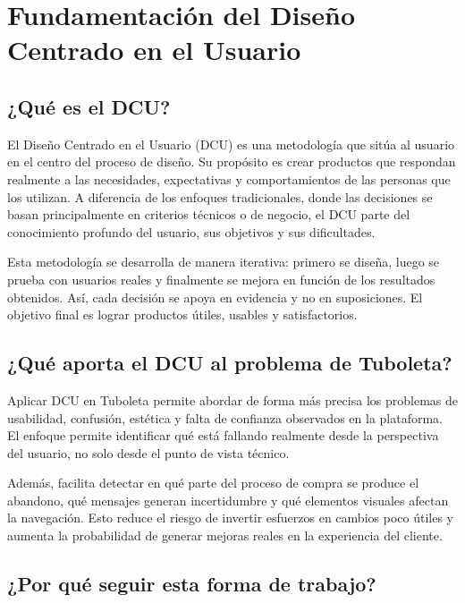 \documentclass[12pt,letterpaper]{article}
\begin{document}
\section{Fundamentación del Diseño Centrado en el Usuario}

\subsection{¿Qué es el DCU?}

El Diseño Centrado en el Usuario (DCU) es una metodología que sitúa al usuario en el centro del proceso de diseño. Su propósito es crear productos que respondan realmente a las necesidades, expectativas y comportamientos de las personas que los utilizan. A diferencia de los enfoques tradicionales, donde las decisiones se basan principalmente en criterios técnicos o de negocio, el DCU parte del conocimiento profundo del usuario, sus objetivos y sus dificultades.

Esta metodología se desarrolla de manera iterativa: primero se diseña, luego se prueba con usuarios reales y finalmente se mejora en función de los resultados obtenidos. Así, cada decisión se apoya en evidencia y no en suposiciones. El objetivo final es lograr productos útiles, usables y satisfactorios.

\subsection{¿Qué aporta el DCU al problema de Tuboleta?}

Aplicar DCU en Tuboleta permite abordar de forma más precisa los problemas de usabilidad, confusión, estética y falta de confianza observados en la plataforma. El enfoque permite identificar qué está fallando realmente desde la perspectiva del usuario, no solo desde el punto de vista técnico.

Además, facilita detectar en qué parte del proceso de compra se produce el abandono, qué mensajes generan incertidumbre y qué elementos visuales afectan la navegación. Esto reduce el riesgo de invertir esfuerzos en cambios poco útiles y aumenta la probabilidad de generar mejoras reales en la experiencia del cliente.

\subsection{¿Por qué seguir esta forma de trabajo?}
\end{document}
